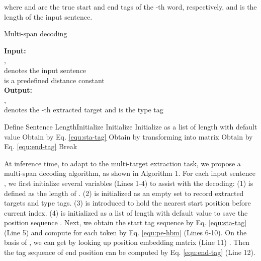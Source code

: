 \documentclass{ecai}
\begin{document}
\noindent where  and  are the true start and end tags of the -th word, respectively, and  is the length of the input sentence.

\begin{algorithm}[t]
\label{algo:hbm}
\small
\caption{Multi-span decoding} 
\label{algo:hmsd}
{\bf Input:} \hspace*{0.02in} \\ 
,  \\
\hspace*{0.15in}  denotes the input sentence\\
\hspace*{0.15in}  is a predefined distance constant\\
{\bf Output:} \hspace*{0.02in}\\ 
, \\
\hspace*{0.15in}  denotes the -th extracted target and  is the type tag
\begin{algorithmic}[1]
\State Define  Sentence Length\State Initialize \State Initialize  \State Initialize  as a  list of length  with default value \State Obtain  by Eq. \ref{equ:sta-tag}  
      \State  
  \EndIf
  \If{}
    \State  
  \EndIf
\EndFor 
\State Obtain  by transforming  into matrix \State Obtain  by Eq. \ref{equ:end-tag} 
     
      \State 
      \State {}
      \State 
      \State Break
      \EndIf
    \EndFor 
  \EndIf
\EndFor 
\State \Return 
\end{algorithmic}
\end{algorithm}


At inference time, to adapt to the multi-target extraction task, we propose a multi-span decoding algorithm, as shown in Algorithm 1. 
For each input sentence , we first initialize several variables (Lines 1-4) to assist with the decoding: (1)  is defined as the length of . (2)  is initialized as an empty set to record extracted targets and type tags. (3)  is introduced to hold the nearest start position before current index. (4)  is initialized as a list of length  with default value  to save the position sequence . 
Next, we obtain the start tag sequence by Eq. \ref{equ:sta-tag} (Line 5) and compute  for each token by Eq. \ref{equ:pe-hbm} (Lines 6-10). 
On the basis of , we can get  by looking up position embedding matrix (Line 11) . 
Then the tag sequence of end position can be computed by Eq. \ref{equ:end-tag} (Line 12). 
\end{document}
